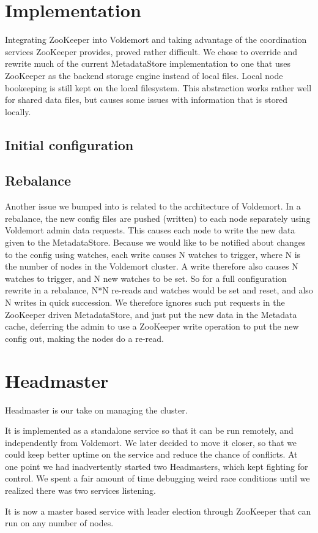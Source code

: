 
\section{Implementation}
Integrating ZooKeeper into Voldemort and taking advantage of the coordination services ZooKeeper provides, proved rather difficult.
We chose to override and rewrite much of the current MetadataStore implementation to one that uses ZooKeeper as the backend storage engine instead of local files. Local node bookeeping is still kept on the local filesystem.
This abstraction works rather well for shared data files, but causes some issues with information that is stored locally.

\subsection{Initial configuration}


\subsection{Rebalance}
Another issue we bumped into is related to the architecture of Voldemort.
In a rebalance, the new config files are pushed (written) to each node separately using Voldemort admin data requests. This causes each node to write the new data given to the MetadataStore.
Because we would like to be notified about changes to the config using watches, each write causes N watches to trigger, where N is the number of nodes in the Voldemort cluster.
A write therefore also causes N watches to trigger, and N new watches to be set. So for a full configuration rewrite in a rebalance, N*N re-reads and watches would be set and reset, and also N writes in quick succession.
We therefore ignores such put requests in the ZooKeeper driven MetadataStore, and just put the new data in the Metadata cache, deferring the admin to use a ZooKeeper write operation to put the new config out, making the nodes do a re-read.

\section{Headmaster}
Headmaster is our take on managing the cluster.

It is implemented as a standalone service so that it can be run remotely, and independently from Voldemort.
We later decided to move it closer, so that we could keep better uptime on the service and reduce the chance of conflicts.
At one point we had inadvertently started two Headmasters, which kept fighting for control.
We spent a fair amount of time debugging weird race conditions until we realized there was two services listening.

It is now a master based service with leader election through ZooKeeper that can run on any number of nodes.

